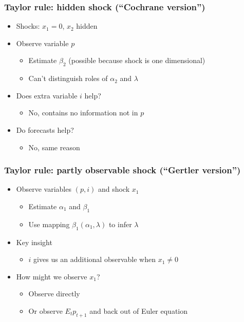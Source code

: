 \documentclass{beamer}
\begin{document}
\begin{frame}
\frametitle{Taylor rule:  hidden shock (``Cochrane version'')}
\begin{itemize}  \itemsep=\bigskipamount
\item Shocks:  $x_1 = 0$, $x_2$ hidden
\item Observe variable $p$  \\
\begin{itemize}
\item Estimate $\beta_2$  (possible because shock is one dimensional)
\item Can't distinguish roles of $\alpha_2$ and $\lambda$
\end{itemize}
\item Does extra variable $i$ help?  \\
\begin{itemize}
\item No, contains no information not in $p$
\end{itemize}
\item Do forecasts help? \\
\begin{itemize}
\item No, same reason
\end{itemize}
\end{itemize}
\end{frame}

\begin{frame}
\frametitle{Taylor rule:  partly observable shock (``Gertler version'')}
\begin{itemize}  \itemsep=\bigskipamount
\item Observe variables $(p,i)$ and shock $x_1$ \\
\begin{itemize}
\item Estimate $\alpha_{1}$ and $\beta_{1}$
\item Use mapping  $\beta_1(\alpha_1,\lambda)$ to infer $\lambda$
\end{itemize}
\item Key insight \\
\begin{itemize}
\item $i$ gives us an additional observable when $x_1 \neq 0$
\end{itemize}
\item How might we observe $x_1$?  \\
\begin{itemize}
\item Observe directly
\item Or observe $E_t p_{t+1}$ and back out of Euler equation
\end{itemize}
\end{itemize}
\end{frame}
\end{document}
